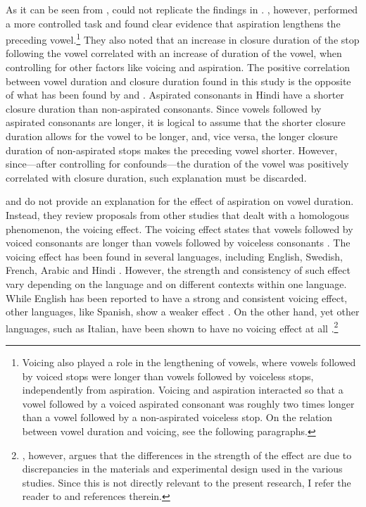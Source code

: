 \documentclass[11pt,a4paper,oneside,openany]{memoir}\usepackage[]{graphicx}\usepackage[]{color}
\begin{document}
As it can be seen from , \citet{lampp2004} could not replicate the findings in \citet{maddieson1976}.
\citet{durvasula2012}, however, performed a more controlled task and found clear evidence that aspiration lengthens the preceding vowel.\footnote{Voicing also played a role in the lengthening of vowels, where vowels followed by voiced stops were longer than vowels followed by voiceless stops, independently from aspiration.
Voicing and aspiration interacted so that a vowel followed by a voiced aspirated consonant was roughly two times longer than a vowel followed by a non-aspirated voiceless stop.
On the relation between vowel duration and voicing, see the following paragraphs.}
They also noted that an increase in closure duration of the stop following the vowel correlated with an increase of duration of the vowel, when controlling for other factors like voicing and aspiration.
The positive correlation between vowel duration and closure duration found in this study is the opposite of what has been found by \citet{maddieson1976} and \citet{lampp2004}.
Aspirated consonants in Hindi have a shorter closure duration than non-aspirated consonants.
Since vowels followed by aspirated consonants are longer, it is logical to assume that the shorter closure duration allows for the vowel to be longer, and, vice versa, the longer closure duration of non-aspirated stops makes the preceding vowel shorter.
However, since---after controlling for confounds---the duration of the vowel was positively correlated with closure duration, such explanation must be discarded.

\citet{maddieson1976} and \citet{durvasula2012} do not provide an explanation for the effect of aspiration on vowel duration.
Instead, they review proposals from other studies that dealt with a homologous phenomenon, the voicing effect.
The voicing effect states that vowels followed by voiced consonants are longer than vowels followed by voiceless consonants \citep{house1953,chen1970,hussein1994,durvasula2012}.
The voicing effect has been found in several languages, including English, Swedish, French, Arabic and Hindi \citep[p. 191]{soskuthy2013}.
However, the strength and consistency of such effect vary depending on the language and on different contexts within one language.
While English has been reported to have a strong and consistent voicing effect, other languages, like Spanish, show a weaker effect \citep{hussein1994}.
On the other hand, yet other languages, such as Italian, have been shown to have no voicing effect at all \citep{esposito2002}.\footnote{\citet{laeufer1992}, however, argues that the differences in the strength of the effect are due to discrepancies in the materials and experimental design used in the various studies.
Since this is not directly relevant to the present research, I refer the reader to \citet{laeufer1992} and references therein.
} 
\end{document}
